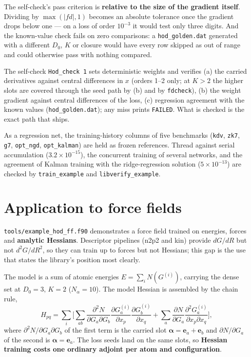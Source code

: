 \documentclass[10pt,a4paper]{article}
\newcommand{\code}[1]{\texttt{#1}}
\newcommand{\mi}[1]{\boldsymbol{#1}}
\begin{document}
The self-check's pass criterion is \textbf{relative to the size of
the gradient itself}. Dividing by $\max(|fd|,1)$ becomes an absolute
tolerance once the gradient drops below one --- on a loss of order
$10^{-3}$ it would test only three digits. And the known-value check
fails on zero comparisons: a \code{hod\_golden.dat} generated with a
different $D_0$, $K$ or closure would have every row skipped as out
of range and could otherwise pass with nothing compared.

The self-check \code{Hod\_check 1} sets deterministic weights and
verifies (a) the carried derivatives against central differences in
$x$ (orders 1--2 only; at $K>2$ the higher slots are covered through
the seed path by (b) and by \code{fdcheck}), (b) the weight gradient
against central differences of the loss, (c) regression agreement
with the known values (\code{hod\_golden.dat}); any miss prints
\code{FAILED}. What is checked is the exact path that ships.

As a regression net, the training-history columns of five benchmarks
(\code{kdv}, \code{zk7}, \code{g7}, \code{opt\_ngd},
\code{opt\_kalman}) are held as frozen references. Thread against
serial accumulation ($3.2\times10^{-15}$), the concurrent training of
several networks, and the agreement of Kalman training with the
ridge-regression solution ($5\times10^{-13}$) are checked by
\code{train\_example} and \code{libverify\_example}.

\section{Application to force fields}

\code{tools/example\_hod\_ff.f90} demonstrates a force field trained
on energies, forces and \textbf{analytic Hessians}. Descriptor
pipelines (n2p2 and kin) provide $dG/dR$ but not $d^2G/dR^2$, so they
can train up to forces but not Hessians; this gap is the use that
states the library's position most clearly.

The model is a sum of atomic energies $E=\sum_i N(G^{(i)})$, carrying
the dense set at $D_0=3$, $K=2$ ($N_\alpha=10$). The model Hessian is
assembled by the chain rule,
\[
H_{pq}=\sum_i\Big[\sum_{ab} \frac{\partial^2 N}{\partial G_a\partial G_b}
\frac{\partial G_a^{(i)}}{\partial x_p}\frac{\partial G_b^{(i)}}{\partial x_q}
+\sum_a \frac{\partial N}{\partial G_a}
\frac{\partial^2 G_a^{(i)}}{\partial x_p\partial x_q}\Big],
\]
where $\partial^2N/\partial G_a\partial G_b$ of the first term is the
carried slot $\mi\alpha=\mi e_a+\mi e_b$ and
$\partial N/\partial G_a$ of the second is $\mi\alpha=\mi e_a$. The
loss seeds land on the same slots, so \textbf{Hessian training costs
one ordinary adjoint per atom and configuration}.
\end{document}
